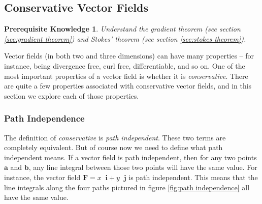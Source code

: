 \documentclass{myarticle}
\renewcommand{\vec}[1]{\mathbf{#1}}
\newcommand{\unitvector}[1]{
  \mathop{}\!\vec{#1}
}
\newcommand{\ih}{\unitvector{i}}
\newcommand{\jh}{\unitvector{j}}
\theoremstyle{nospace}
\newtheorem*{oldprereq}{Prerequisite Knowledge}
\newenvironment{prereq}{\begin{mdframed}\begin{oldprereq}}{\end{oldprereq}\end{mdframed}}
\newtheorem{old series theorem}{Theorem}
\newenvironment{series theorem}{\begin{mdframed}\begin{old series theorem}}{\end{old series theorem}\end{mdframed}}
\begin{document}
\subsection{Conservative Vector Fields} \label{sec:conservative vector fields}

\begin{prereq} Understand the gradient theorem (see section \ref{sec:gradient theorem}) and Stokes' theorem (see section \ref{sec:stokes theorem}). \end{prereq}

Vector fields (in both two and three dimensions) can have many properties -- for instance, being divergence free, curl free, differentiable, and so on. One of the most important properties of a vector field is whether it is \textit{conservative}. There are quite a few properties associated with conservative vector fields, and in this section we explore each of those properties.

\subsubsection{Path Independence} \label{sec:path independence}

The definition of \textit{conservative} is \textit{path independent}. These two terms are completely equivalent. But of course now we need to define what path independent means. If a vector field is path independent, then for any two points $\vec{a}$ and $\vec{b}$, any line integral between those two points will have the same value. For instance, the vector field $\vec{F} = x \ih + y \jh$ is path independent. This means that the line integrals along the four paths pictured in figure \ref{fig:path independence} all have the same value.
\end{document}
